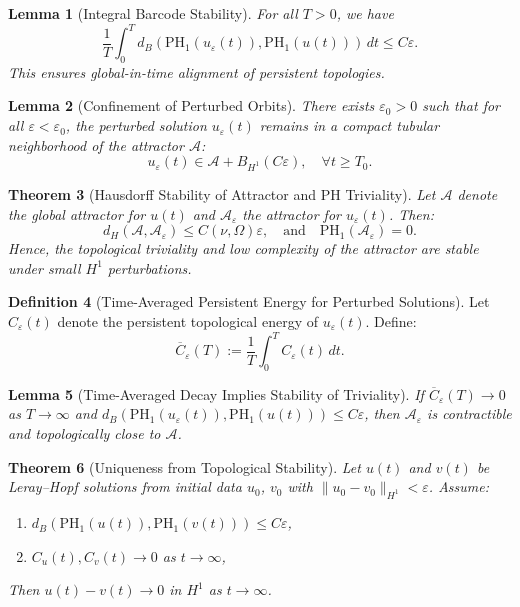 \documentclass[11pt]{article}
\newtheorem{theorem}{Theorem}[section]
\newtheorem{lemma}[theorem]{Lemma}
\theoremstyle{definition}
\newtheorem{definition}[theorem]{Definition}
\begin{document}
\begin{lemma}[Integral Barcode Stability]
For all $T > 0$, we have
\[
\frac{1}{T} \int_0^T d_B(\mathrm{PH}_1(u_\varepsilon(t)), \mathrm{PH}_1(u(t))) \, dt \le C \varepsilon.
\]
This ensures global-in-time alignment of persistent topologies.
\end{lemma}

\begin{lemma}[Confinement of Perturbed Orbits]
There exists $\varepsilon_0 > 0$ such that for all $\varepsilon < \varepsilon_0$, the perturbed solution $u_\varepsilon(t)$ remains in a compact tubular neighborhood of the attractor $\mathcal{A}$:
\[
u_\varepsilon(t) \in \mathcal{A} + B_{H^1}(C\varepsilon), \quad \forall t \ge T_0.
\]
\end{lemma}

\begin{theorem}[Hausdorff Stability of Attractor and PH Triviality]
\label{thm:attractor_stability}
Let $\mathcal{A}$ denote the global attractor for $u(t)$ and $\mathcal{A}_\varepsilon$ the attractor for $u_\varepsilon(t)$. Then:
\[
d_H(\mathcal{A}, \mathcal{A}_\varepsilon) \le C(\nu, \Omega)\varepsilon, \quad \text{and} \quad \mathrm{PH}_1(\mathcal{A}_\varepsilon) = 0.
\]
Hence, the topological triviality and low complexity of the attractor are stable under small $H^1$ perturbations.
\end{theorem}

\begin{definition}[Time-Averaged Persistent Energy for Perturbed Solutions]
Let $C_\varepsilon(t)$ denote the persistent topological energy of $u_\varepsilon(t)$. Define:
\[
\overline{C}_\varepsilon(T) := \frac{1}{T} \int_0^T C_\varepsilon(t)\, dt.
\]
\end{definition}

\begin{lemma}[Time-Averaged Decay Implies Stability of Triviality]
If $\overline{C}_\varepsilon(T) \to 0$ as $T \to \infty$ and $d_B(\mathrm{PH}_1(u_\varepsilon(t)), \mathrm{PH}_1(u(t))) \le C \varepsilon$, then $\mathcal{A}_\varepsilon$ is contractible and topologically close to $\mathcal{A}$.
\end{lemma}

\begin{theorem}[Uniqueness from Topological Stability]
Let $u(t)$ and $v(t)$ be Leray--Hopf solutions from initial data $u_0$, $v_0$ with $\|u_0 - v_0\|_{H^1} < \varepsilon$. Assume:
\begin{enumerate}
  \item $d_B(\mathrm{PH}_1(u(t)), \mathrm{PH}_1(v(t))) \leq C\varepsilon$,
  \item $C_u(t), C_v(t) \to 0$ as $t \to \infty$,
\end{enumerate}
Then $u(t) - v(t) \to 0$ in $H^1$ as $t \to \infty$.
\end{theorem}
\end{document}
